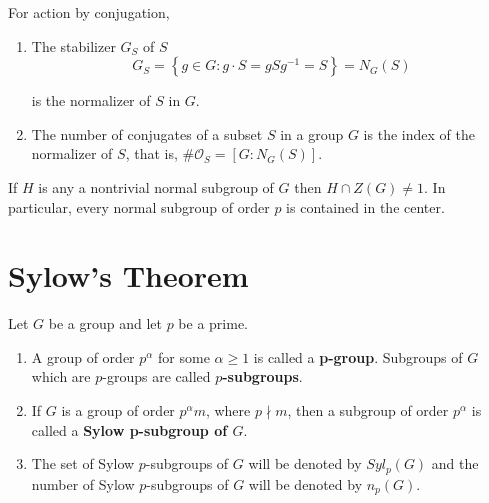 \begin{proposition}
    For action by conjugation,
    \begin{enumerate}
        \item
              The stabilizer $G_S$ of $S$
              \begin{equation*}
                  G_S=\left\{g \in G : g\cdot S = g S g^{-1}=S\right\}=N_G(S)
              \end{equation*}

              is the normalizer of $S$ in $G$.

        \item
              The number of conjugates of a subset $S$ in a group $G$ is the index of the normalizer of $S$, that is, $ \# \mathcal{O}_S=\left[G: N_G(S)\right]$.
    \end{enumerate}
\end{proposition}




\begin{corollary}
    If $H$ is any a nontrivial normal subgroup of $G$ then $H \cap Z(G) \neq 1$. In particular, every normal subgroup of order $p$ is contained in the center.
\end{corollary}




\section{Sylow's Theorem} %
\begin{definition}
    Let $G$ be a group and let $p$ be a prime.
    \begin{enumerate}
        \item
              A group of order $p^\alpha$ for some $\alpha \geq 1$ is called a \textbf{p-group}. Subgroups of $G$ which are $p$-groups are called \textbf{$p$-subgroups}.

        \item
              If $G$ is a group of order $p^\alpha m$, where $p \nmid m$, then a subgroup of order $p^\alpha$ is called a \textbf{Sylow p-subgroup of $G$}.

        \item
              The set of Sylow $p$-subgroups of $G$ will be denoted by $S y l_p(G)$ and the number of Sylow $p$-subgroups of $G$ will be denoted by $n_p(G)$.
    \end{enumerate}
\end{definition}

